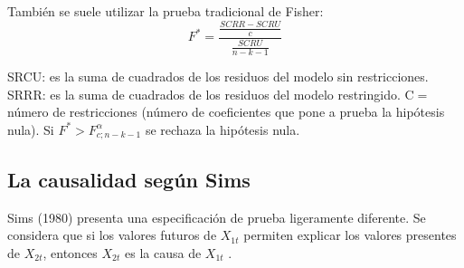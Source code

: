 Tambi\'{e}n se suele utilizar la prueba tradicional de Fisher:
\[
F^{\ast }=\frac{\frac{SCRR-SCRU}{c}}{\frac{SCRU}{n-k-1}}
\]

SRCU: es la suma de cuadrados de los residuos del modelo sin restricciones.\newline
SRRR: es la suma de cuadrados de los residuos del modelo restringido.\newline
C$=$ n\'{u}mero de restricciones (n\'{u}mero de coeficientes que pone a prueba la hip\'{o}tesis nula).
Si $F^{\ast }>F_{c;n-k-1}^{\alpha }$ se rechaza la hip\'{o}tesis nula.

\subsection{La causalidad seg\'{u}n Sims}
\label{subsubsec:mylabel13}
Sims (1980) presenta una especificaci\'{o}n de prueba ligeramente diferente. Se considera que si los valores futuros de $X_{1t}$ permiten explicar los valores presentes de $X_{2t}$, entonces $X_{2t}$ es la causa de $X_{1t}$ . 

